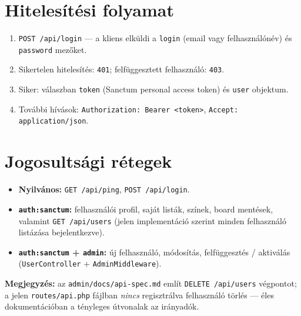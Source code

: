 \section{Hitelesítési folyamat}
\begin{enumerate}
  \item \texttt{POST /api/login} — a kliens elküldi a \texttt{login} (email vagy felhasználónév) és \texttt{password} mezőket.
  \item Sikertelen hitelesítés: \texttt{401}; felfüggesztett felhasználó: \texttt{403}.
  \item Siker: válaszban \texttt{token} (Sanctum personal access token) és \texttt{user} objektum.
  \item További hívások: \texttt{Authorization: Bearer <token>}, \texttt{Accept: application/json}.
\end{enumerate}

\section{Jogosultsági rétegek}
\begin{itemize}
  \item \textbf{Nyilvános:} \texttt{GET /api/ping}, \texttt{POST /api/login}.
  \item \textbf{\texttt{auth:sanctum}:} felhasználói profil, saját listák, színek, board mentések, valamint \texttt{GET /api/users} (jelen implementáció szerint minden felhasználó listázása bejelentkezve).
  \item \textbf{\texttt{auth:sanctum} + \texttt{admin}:} új felhasználó, módosítás, felfüggesztés / aktiválás (\texttt{UserController} + \texttt{AdminMiddleware}).
\end{itemize}

\textbf{Megjegyzés:} az \texttt{admin/docs/api-spec.md} említ \texttt{DELETE /api/users} végpontot; a jelen \texttt{routes/api.php} fájlban \emph{nincs} regisztrálva felhasználó törlés — éles dokumentációban a tényleges útvonalak az irányadók.
